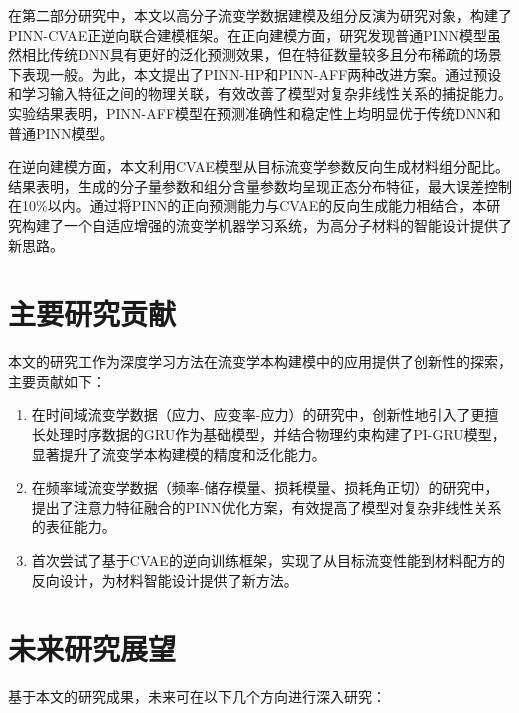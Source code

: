 在第二部分研究中，本文以高分子流变学数据建模及组分反演为研究对象，构建了PINN-CVAE正逆向联合建模框架。在正向建模方面，研究发现普通PINN模型虽然相比传统DNN具有更好的泛化预测效果，但在特征数量较多且分布稀疏的场景下表现一般。为此，本文提出了PINN-HP和PINN-AFF两种改进方案。通过预设和学习输入特征之间的物理关联，有效改善了模型对复杂非线性关系的捕捉能力。实验结果表明，PINN-AFF模型在预测准确性和稳定性上均明显优于传统DNN和普通PINN模型。

在逆向建模方面，本文利用CVAE模型从目标流变学参数反向生成材料组分配比。结果表明，生成的分子量参数和组分含量参数均呈现正态分布特征，最大误差控制在10\%以内。通过将PINN的正向预测能力与CVAE的反向生成能力相结合，本研究构建了一个自适应增强的流变学机器学习系统，为高分子材料的智能设计提供了新思路。

\section*{主要研究贡献}
本文的研究工作为深度学习方法在流变学本构建模中的应用提供了创新性的探索，主要贡献如下：

\begin{enumerate}[topsep = 0 pt, itemsep= 0 pt, parsep=0pt, partopsep=0pt, leftmargin=0pt, itemindent=44pt, labelsep=6pt, label=(\arabic*)]
  \item 在时间域流变学数据（应力、应变率-应力）的研究中，创新性地引入了更擅长处理时序数据的GRU作为基础模型，并结合物理约束构建了PI-GRU模型，显著提升了流变学本构建模的精度和泛化能力。
  \item 在频率域流变学数据（频率-储存模量、损耗模量、损耗角正切）的研究中，提出了注意力特征融合的PINN优化方案，有效提高了模型对复杂非线性关系的表征能力。
  \item 首次尝试了基于CVAE的逆向训练框架，实现了从目标流变性能到材料配方的反向设计，为材料智能设计提供了新方法。
\end{enumerate}

\section*{未来研究展望}
基于本文的研究成果，未来可在以下几个方向进行深入研究：

